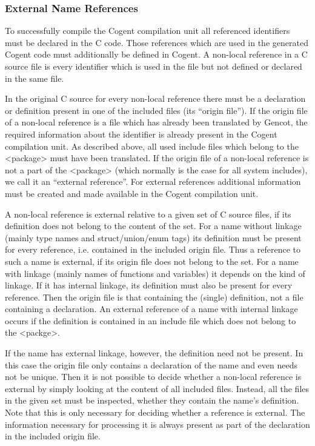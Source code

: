 \subsubsection{External Name References}
\label{design-modular-extref}

To successfully compile the Cogent compilation unit all referenced identifiers must be declared in the C code. 
Those references which are
used in the generated Cogent code must additionally be defined in Cogent. A non-local reference in a C source file is every
identifier which is used in the file but not defined or declared in the same file.

In the original C source for every non-local reference there must be a declaration or definition present in one of the included
files (its ``origin file''). If the origin file of a non-local reference is a file which has already been translated by 
Gencot, the required information about the identifier is already present in the Cogent compilation unit. As described above, 
all used include files which belong to the <package> must have been translated. If the origin file
of a non-local reference is not a part of the <package> (which normally is the case for all
system includes), we call it an ``external reference''. For external references additional information must be created and 
made available in the Cogent compilation unit.

A non-local reference is external relative to a given set of C source files, if its definition does not belong to the content
of the set. For a name without linkage (mainly type names and struct/union/enum tags) its definition must be present for every
reference, i.e. contained in the included origin file. Thus a reference to such a name is external, if its origin file does 
not belong to the set. For a name with linkage (mainly names of functions and variables) it depends on the kind of linkage.
If it has internal linkage, its definition must also be present for every reference. Then the origin file is that containing the
(single) definition, not a file containing a declaration. An external reference of a name with internal linkage occurs if
the definition is contained in an include file which does not belong to the <packge>.

If the name has external linkage, however, the definition need not be present. In this case the origin file only contains a declaration
of the name and even needs not be unique. Then it is not possible to decide whether a non-local reference is external by simply 
looking at the content of all included files. Instead, all the files in the given set must be inspected, whether they contain
the name's definition. Note that this is only necessary for deciding whether a reference is external. The information necessary
for processing it is always present as part of the declaration in the included origin file.

